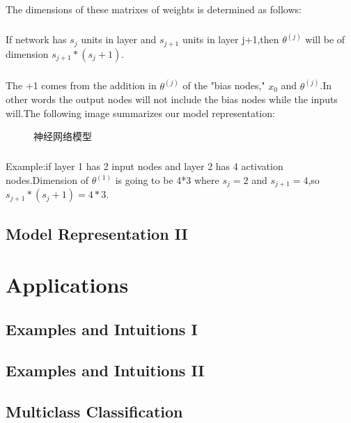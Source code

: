 \documentclass{article}
\begin{document}
\begin{CJK}{UTF8}{gbsn}
The dimensions of these matrixes of weights is determined as follows:
\subparagraph{}
If network has $s_j$ units in layer and $s_{j+1}$ units in layer j+1,then $\theta^{(j)}$ will be of dimension $s_{j+1}*(s_j+1)$.
\subparagraph{}
The +1 comes from the addition in $\theta^{(j)}$ of the "bias nodes," $x_0$ and $\theta^{(j)}$.In other words the output nodes will not include the bias nodes while the inputs will.The following image summarizes our model representation:
\begin{figure}[H]
\caption{神经网络模型}
\label{fig:412}
\end{figure}
\subparagraph{}
Example:if layer 1 has 2 input nodes and layer 2 has 4 activation nodes.Dimension of $\theta^{(1)}$ is going to be 4*3 where $s_j=2$ and $s_{j+1}=4$,so $s_{j+1}*(s_j+1)=4*3$.
\subsection{Model Representation II}
\section{Applications}
\subsection{Examples and Intuitions I}
\subsection{Examples and Intuitions II}
\subsection{Multiclass Classification}

\end{CJK}
\end{document}

